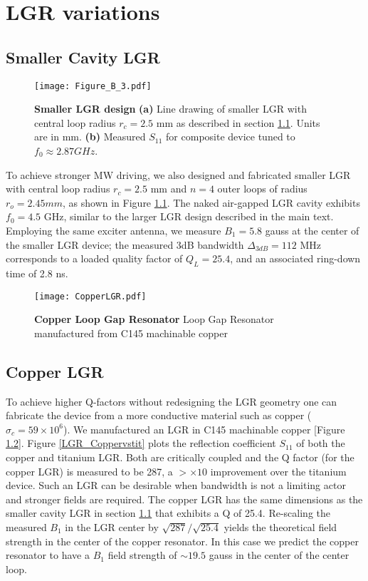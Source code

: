 \chapter{LGR variations} %

\section{Smaller Cavity LGR} \label{smallLGR}
\begin{figure}[b!]
\centering
\texttt{[image: Figure\_B\_3.pdf]}  
\caption{\textbf{Smaller LGR design} \textbf{(a)} Line drawing of smaller LGR with central loop radius $r_c = 2.5$ mm as described in section \ref{smallLGR}. Units are in mm. \textbf{(b)} Measured $S_{11}$ for composite device tuned to $f_0 \approx 2.87 GHz$.}
\label{smallLGRfigure}
\end{figure}   
To achieve stronger MW driving, we also designed and fabricated
smaller LGR with central loop radius $r_c = 2.5$ mm and $n = 4$ outer loops of radius $r_o = 2.45mm$, as shown in Figure \ref{smallLGRfigure}. The naked air-gapped LGR cavity exhibits $f_0 = 4.5$ GHz, similar to the larger LGR design described in the main text. Employing the same exciter antenna, we measure $B_1 = 5.8$ gauss at the center of the smaller LGR device; the measured 3dB bandwidth $\Delta_{3dB} = 112$ MHz corresponds to a loaded quality factor of $Q_L = 25.4$, and an associated ring-down time of 2.8 ns.


\begin{figure}[t!]
\centering
\texttt{[image: CopperLGR.pdf]}  
\caption{\textbf{Copper Loop Gap Resonator} Loop Gap Resonator manufactured from C145 machinable copper}
\label{LGR_Copper}
\end{figure}   


\section{Copper LGR} \label{CopperLGR}

To achieve higher Q-factors without redesigning the LGR geometry one can fabricate the device from a more conductive material such as copper ($\sigma_c = 59 \times 10^6$). We manufactured an LGR in C145 machinable copper [Figure \ref{LGR_Copper}]. Figure \ref{LGR_Coppervstit} plots the reflection coefficient $S_{11}$ of both the copper and titanium LGR. Both are critically coupled and the Q factor (for the copper LGR) is measured to be 287, a $>\times 10$ improvement over the titanium device. Such an LGR can be desirable when bandwidth is not a limiting actor and stronger fields are required. The copper LGR has the same dimensions as the smaller cavity LGR in section \ref{smallLGR} that exhibits a Q of 25.4. Re-scaling the measured $B_1$ in the LGR center by $\sqrt{287}/\sqrt{25.4}$ yields the theoretical field strength in the center of the copper resonator. In this case we predict the copper resonator to have a $B_1$ field strength of $\sim 19.5$ gauss in the center of the center loop.  

